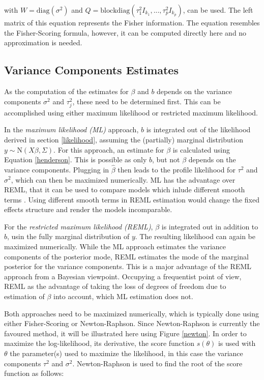 \documentclass[12pt]{article}
\begin{document}
 with $W=\text{diag}(\sigma^2)$ and $Q=\text{blockdiag}(\tau_1^2I_{k_1},..., \tau_p^2I_{k_p})$, can be used. The left matrix of this equation represents the Fisher information. The equation resembles the Fisher-Scoring formula, however, it can be computed directly here and no approximation is needed.
 
 \subsection{Variance Components Estimates}\label{varianceestimates}

As the computation of the estimates for $\beta$ and $b$ depends on the variance components $\sigma^2$ and $\tau_j^2$, these need to be determined first. This can be accomplished using either maximum likelihood or restricted maximum likelihood. 

In the \textit{maximum likelihood (ML)} approach, $b$ is integrated out of the likelihood derived in section \ref{likelihood}, assuming the (partially) marginal distribution $y \sim \mathrm{N}(X\beta,\Sigma)$. For this approach, an estimate for $\beta$ is calculated using Equation \ref{henderson}. This is possible as only $b$, but not $\beta$ depends on the variance components. Plugging in $\hat{\beta}$ then leads to the profile likelihood for $\tau^2$ and $\sigma^2$, which can then be maximized numerically. ML has the advantage over REML, that it can be used to compare models which inlude different smooth terms \cite{wood2011fast}. Using different smooth terms in REML estimation would change the fixed effects structure and render the models incomparable.

For the \textit{restricted maximum likelihood (REML)}, $\beta$ is integrated out in addition to $b$, usin the fully marginal distribution of $y$. The resulting likelihood can again be maximized numerically.
While the ML approach estimates the variance components of the posterior mode, REML estimates the mode of the marginal posterior for the variance components. This is a major advantage of the REML approach from a Bayesian viewpoint. Occupying a frequentist point of view, REML as the advantage of taking the loss of degrees of freedom due to estimation of $\beta$ into account, which ML estimation does not.

Both approaches need to be maximized numerically, which is typically done using either Fisher-Scoring or Newton-Raphson. Since Newton-Raphson is currently the favoured method, it will be illustrated here using Figure \ref{newton}. In order to maximize the log-likelihood, its derivative, the score function $s(\theta)$ is used with $\theta$ the parameter(s) used to maximize the likelihood, in this case the variance components $\tau^2$ and $\sigma^2$. 
Newton-Raphson is used to find the root of the score function as follows:
\end{document}

